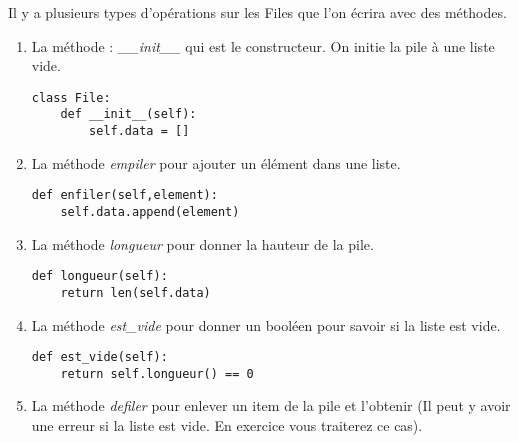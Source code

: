 \documentclass[12pt,fleqn]{article} %
\begin{document}
Il y a plusieurs types d'opérations sur les Files que l'on écrira avec des méthodes.
\begin{enumerate}
	\item La méthode : \textit{\_\_init\_\_} qui est le constructeur. On initie la pile à une liste vide.
	\begin{center}
		\begin{varwidth}[t]{.5\textwidth}
			\begin{lstlisting}[language=iPython,linewidth = 15cm]
class File:
	def __init__(self):
		self.data = []\end{lstlisting}
	\end{varwidth}\end{center}
	\item La méthode \textit{empiler} pour ajouter un élément dans une liste.
	\begin{center}
		\begin{varwidth}[t]{.5\textwidth}
			\begin{lstlisting}[language=iPython,linewidth = 15cm]
def enfiler(self,element):
	self.data.append(element)\end{lstlisting}
	\end{varwidth}\end{center}
	\item La méthode \textit{longueur} pour donner la hauteur de la pile.
	\begin{center}
		\begin{varwidth}[t]{.5\textwidth}
			\begin{lstlisting}[language=iPython,linewidth = 15cm]
def longueur(self):
	return len(self.data)\end{lstlisting}
	\end{varwidth}\end{center}
	\item La méthode \textit{est\_vide} pour donner un booléen pour savoir si la liste est vide.
	\begin{center}
		\begin{varwidth}[t]{.5\textwidth}
			\begin{lstlisting}[language=iPython,linewidth = 15cm]
def est_vide(self):
	return self.longueur() == 0\end{lstlisting}
	\end{varwidth}\end{center}
	\item La méthode \textit{defiler} pour enlever un item de la pile et l'obtenir (Il peut y avoir une erreur si la liste est vide. En exercice vous traiterez ce cas).

\end{enumerate}
\end{document}
